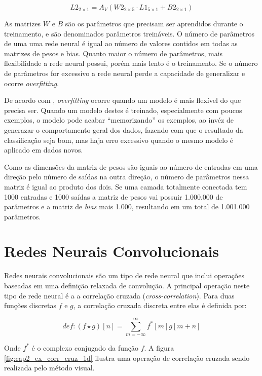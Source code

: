 \begin{equation}
	L2_{2 \times 1}=A_V \left( W2_{2 \times 5} \cdot L1_{5 \times 1}
		+ B2_{2 \times 1} \right)
\end{equation}

As matrizes $W$ e $B$ são os parâmetros que precisam ser aprendidos durante o
treinamento, e são denominados parâmetros treináveis. O número de parâmetros
de uma uma
rede neural é igual ao número de valores contidos em todas as matrizes de pesos
e bias. Quanto maior o número de parâmetros, mais flexibilidade a rede neural
possui, porém mais lento é o treinamento. Se o número de parâmetros for
excessivo a rede neural perde a capacidade de generalizar e ocorre
\emph{overfitting}.

De acordo com \cite{hawkins2004problem}, \emph{overfitting} ocorre quando um
modelo é mais flexível do que precisa ser. Quando um modelo destes é treinado,
especialmente com poucos exemplos, o modelo pode acabar ``memorizando'' os
exemplos, ao invéz de generazar o comportamento geral dos dados, fazendo
com que o resultado da classificação seja bom, mas haja erro excessivo
quando o mesmo modelo é aplicado em dados novos.

Como as dimensões da matriz de pesos são iguais ao número de entradas em uma
direção pelo número de saídas na outra direção, o número de parâmetros nessa
matriz é igual ao produto dos dois. Se uma camada totalmente conectada tem 1000
entradas e 1000 saídas a matriz de pesos vai possuir 1.000.000 de parâmetros
e a matriz de \emph{bias} mais 1.000, resultando em um total de 1.001.000
parâmetros.

\section{Redes Neurais Convolucionais}
Redes neurais convolucionais são um tipo de rede neural que inclui operações
baseadas em uma definição relaxada de convolução. A principal operação
neste tipo de rede neural é a a correlação cruzada (\emph{cross-correlation}).
Para duas funções discretas $f$ e $g$, a correlação cruzada discreta entre
elas é definida por:

\begin{equation}
	def: (f \star g)[n] = \sum_{m=-\infty}^{\infty} f^*[m]g[m+n]
\end{equation}

Onde $f^*$ é o complexo conjugado da função $f$. A figura
\ref{fig:cap2_ex_corr_cruz_1d} ilustra uma operação de correlação cruzada sendo
realizada pelo método visual.

